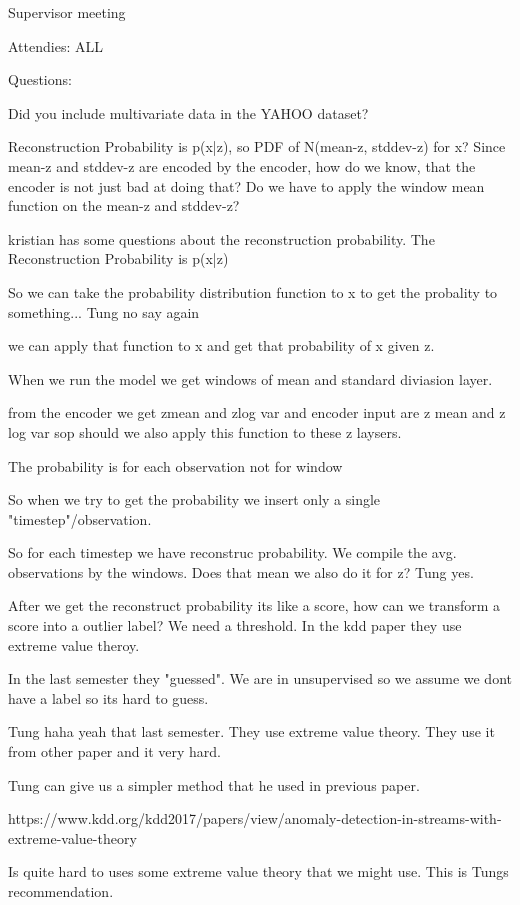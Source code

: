 Supervisor meeting 

Attendies:
ALL


Questions:

Did you include multivariate data in the YAHOO dataset?

Reconstruction Probability is p(x|z), so PDF of N(mean-z, stddev-z) for x?
Since mean-z and stddev-z are encoded by the encoder, how do we know, that the encoder is not just bad at doing that?
Do we have to apply the window mean function on the mean-z and stddev-z?


kristian has some questions about the reconstruction probability.
The Reconstruction Probability is p(x|z)

So we can take the probability distribution function to x to get the probality to something... Tung no say again

we can apply that function to x and get that probability of x given z.

When we run the model we get windows of mean and standard diviasion layer.

from the encoder we get zmean and zlog var and encoder input are z mean and z log var sop should we also apply this function to these z laysers.


The probability is for each observation not for window

So when we try to get the probability we insert only a single "timestep"/observation.

So for each timestep we have reconstruc probability. We compile the avg. observations by the windows. Does that mean we also do it for z? Tung yes.

After we get the reconstruct probability its like a score, how can we transform a score into a outlier label? We need a threshold. In the kdd paper they use extreme value theroy.

In the last semester they "guessed". We are in unsupervised so we assume we dont have a label so its hard to guess.

Tung haha yeah that last semester. They use extreme value theory. They use it from other paper and it very hard. 

Tung can give us a simpler method that he used in previous paper. 

https://www.kdd.org/kdd2017/papers/view/anomaly-detection-in-streams-with-extreme-value-theory

Is quite hard to uses some extreme value theory that we might use. This is Tungs recommendation. 

